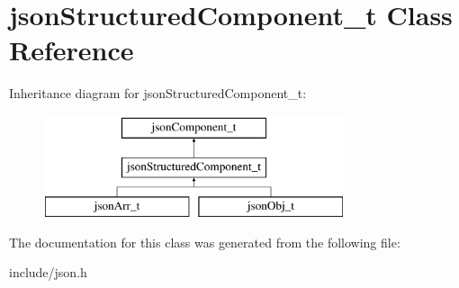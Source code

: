 \hypertarget{classjsonStructuredComponent__t}{\section{json\-Structured\-Component\-\_\-t \-Class \-Reference}
\label{classjsonStructuredComponent__t}
}
\-Inheritance diagram for json\-Structured\-Component\-\_\-t\-:\begin{figure}[H]
\begin{center}
\leavevmode
\includegraphics[height=3.000000cm]{classjsonStructuredComponent__t}
\end{center}
\end{figure}


\-The documentation for this class was generated from the following file\-:\begin{DoxyCompactItemize}
\item 
include/json.\-h\end{DoxyCompactItemize}
